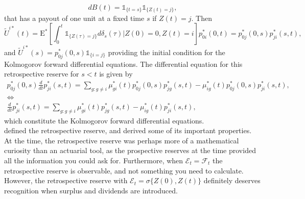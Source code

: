 \documentclass[12pt]{article}
\newcommand{\E}{\text{E}}
\newcommand{\indic}[1]{\mathds{1}_{ \{ #1 \} }}
\theoremstyle{my_thm}
\begin{document}
$$
dB(t)=\indic{t=s}\indic{Z(t)=j},
$$
that has a payout of one unit at a fixed time $s$ if $Z(t)=j$. Then 
$$
\tilde{U}^{i*}(t)=\E^* \left[ \int_0^t  \indic{Z(\tau)=j} d\delta_{s}(\tau) |Z(0)=0, Z(t)=i \right] p^*_{0i}(0,t) = p^*_{0j}(0,s)p^*_{ji}(s,t),
$$
and $\tilde{U}^{i*}(s)=p^*_{0j}(0,s)\indic{i=j}$ providing the initial condition for the Kolmogorov forward differential equations. The differential equation for this retrospective reserve for $s<t$ is given by 
\begin{gather*}
p^*_{0j}(0,s)\frac{d}{dt}p^*_{ji}(s,t)= \sum_{g:g\neq i} \mu^*_{gi}(t)p^*_{0j}(0,s)p^*_{jg}(s,t)- \mu^*_{ig}(t)p^*_{0j}(0,s)p^*_{ji}(s,t),
\\
\Leftrightarrow
\\
\frac{d}{dt}p^*_{ji}(s,t)= \sum_{g:g\neq i} \mu^*_{gi}(t)p^*_{jg}(s,t)- \mu^*_{ig}(t)p^*_{ji}(s,t),
\end{gather*}
which constitute the Kolmogorov forward differential equations. 
\\[12pt]
\citet{Norberg} defined the retrospective reserve, and derived some of its important properties. At the time, the retrospective reserve was perhaps more of a mathematical curiosity than an actuarial tool, as the prospective reserves at the time provided all the information you could ask for. Furthermore, when $\mathcal{E}_t=\mathcal{F}_t$ the retrospective reserve is observable, and not something you need to calculate. However, the retrospective reserve with $\mathcal{E}_t=\sigma \{Z(0),Z(t)\}$ definitely deserves recognition when surplus and dividends are introduced.
\end{document}
